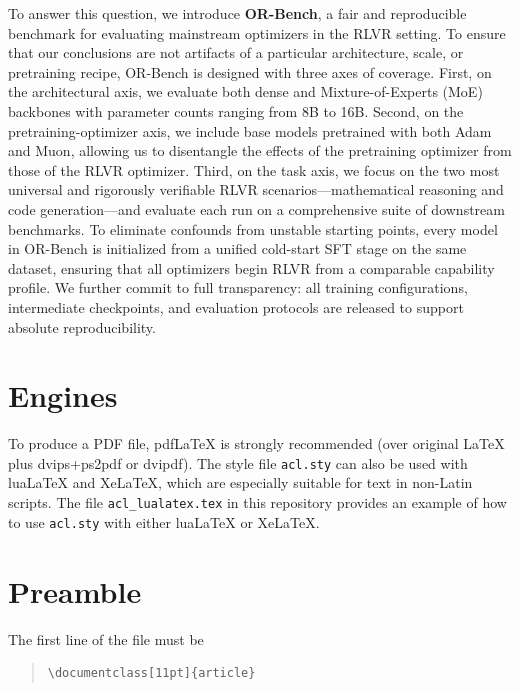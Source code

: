 \documentclass[11pt]{article}
\begin{document}
To answer this question, we introduce \textbf{OR-Bench}, a fair and reproducible benchmark for evaluating mainstream optimizers in the RLVR setting. To ensure that our conclusions are not artifacts of a particular architecture, scale, or pretraining recipe, OR-Bench is designed with three axes of coverage. First, on the architectural axis, we evaluate both dense and Mixture-of-Experts (MoE) backbones with parameter counts ranging from 8B to 16B. Second, on the pretraining-optimizer axis, we include base models pretrained with both Adam and Muon, allowing us to disentangle the effects of the pretraining optimizer from those of the RLVR optimizer. Third, on the task axis, we focus on the two most universal and rigorously verifiable RLVR scenarios---mathematical reasoning and code generation---and evaluate each run on a comprehensive suite of downstream benchmarks. To eliminate confounds from unstable starting points, every model in OR-Bench is initialized from a unified cold-start SFT stage on the same dataset, ensuring that all optimizers begin RLVR from a comparable capability profile. We further commit to full transparency: all training configurations, intermediate checkpoints, and evaluation protocols are released to support absolute reproducibility.


\section{Engines}

To produce a PDF file, pdf\LaTeX{} is strongly recommended (over original \LaTeX{} plus dvips+ps2pdf or dvipdf).
The style file \texttt{acl.sty} can also be used with
lua\LaTeX{} and
Xe\LaTeX{}, which are especially suitable for text in non-Latin scripts.
The file \texttt{acl\_lualatex.tex} in this repository provides
an example of how to use \texttt{acl.sty} with either
lua\LaTeX{} or
Xe\LaTeX{}.

\section{Preamble}

The first line of the file must be
\begin{quote}
\begin{verbatim}
\documentclass[11pt]{article}
\end{verbatim}
\end{quote}
\end{document}

